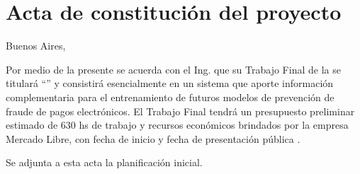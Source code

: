 \documentclass[
11pt, %
]{charter}
\begin{document}
\pagebreak



\section*{Acta de constitución del proyecto}
\label{sec:acta}

\begin{flushright}
Buenos Aires, \fechaInicioName
\end{flushright}

\vspace{2cm}

Por medio de la presente se acuerda con el Ing. \authorname\hspace{1px} que su Trabajo Final de la \degreename\hspace{1px} se titulará ``\ttitle'' y  consistirá esencialmente en un sistema que aporte información complementaria para el entrenamiento de futuros modelos de prevención de fraude de pagos electrónicos. El Trabajo Final tendrá un presupuesto preliminar estimado de 630 hs de trabajo y recursos económicos brindados por la empresa Mercado Libre, con fecha de inicio \fechaInicioName\hspace{1px} y fecha de presentación pública \fechaFinalName.

Se adjunta a esta acta la planificación inicial.

\vfill
\end{document}
